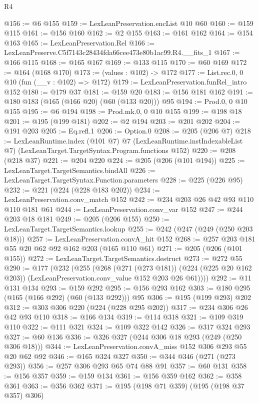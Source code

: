 \begin{lexlean}{R4}
\begin{coremodule}
@156 := @6 @155
@159 := LexLeanPreservation.encList @10 @60
@160 := @159 @115
@161 := @156 @160
@162 := @2 @155
@163 := @161 @162
@164 := @154 @163
@165 := LexLeanPreservation.Rel
@166 := LexLeanPreserve.C5f7143c28434fda66cee473e80b1ac99.R4.__fits_1
@167 := @166 @115
@168 := @165 @167
@169 := @133 @115
@170 := @60 @169
@172 := @164 (@168 @170)
@173 := (values : @102) -> @172
@177 := List.rec.{0, 0} @10 (fun (__v : @102) => @172)
@179 := LexLeanPreservation.funRel_intro @152
@180 := @179 @37
@181 := @159 @20
@183 := @156 @181 @162
@191 := @180 @183 (@165 (@166 @20) (@60 (@133 @20))) @95
@194 := Prod.{0, 0} @10 @155
@195 := @6 @194
@198 := Prod.mk.{0, 0} @10 @155
@199 := @198 @18
@201 := @195 (@199 @181)
@202 := @2 @194
@203 := @201 @202
@204 := @191 @203
@205 := Eq.refl.{1}
@206 := Option.{0}
@208 := @205 (@206 @7)
@218 := LexLeanRuntime.index
    (@101 @7)
    @7
    (LexLeanRuntime.instIndexableList @7)
    (LexLeanTarget.TargetSyntax.Program.functions @152)
@220 := @208 (@218 @37)
@221 := @204 @220
@224 := @205 (@206 (@101 @194))
@225 := LexLeanTarget.TargetSemantics.bindAll
@226 := LexLeanTarget.TargetSyntax.Function.parameters
@228 := @225 (@226 @95)
@232 := @221 (@224 (@228 @183 @202))
@234 := LexLeanPreservation.conv_match @152
@242 := @234 @203 @26 @42 @93 @110 @110 @181 @61
@244 := LexLeanPreservation.conv_var @152
@247 := @244 @203 @18 @181
@249 := @205 (@206 @155)
@250 := LexLeanTarget.TargetSemantics.lookup
@255 := @242 (@247 (@249 (@250 @203 @18)))
@257 := LexLeanPreservation.convA_hit @152
@268 := @257 @203 @181 @55 @20 @62 @92 @162 @203 (@165 @110 @61)
@271 := @205 (@206 (@101 @155))
@272 := LexLeanTarget.TargetSemantics.destruct
@273 := @272 @55
@290 := @177
    (@232
      (@255
        (@268
          (@271 (@273 @181))
          (@224 (@225 @20 @162 @203))
          (LexLeanPreservation.conv_value @152 @203 @26 @61))))
@292 := @11 @131 @134
@293 := @159 @292
@295 := @156 @293 @162
@303 := @180 @295 (@165 (@166 @292) (@60 (@133 @292))) @95
@306 := @195 (@199 @293) @202
@312 := @303 @306 @220 (@224 (@228 @295 @202))
@317 := @234 @306 @26 @42 @93 @110
@318 := @166 @134
@319 := @114 @318
@321 := @109 @319 @110
@322 := @111 @321
@324 := @109 @322 @142
@326 := @317 @324 @293
@327 := @60 @136
@336 := @326 @327 (@244 @306 @18 @293 (@249 (@250 @306 @18)))
@344 := LexLeanPreservation.convA_miss @152 @306 @293 @55 @20 @62 @92
@346 := @165 @324 @327
@350 := @344 @346 (@271 (@273 @293))
@356 := @257 @306 @293 @65 @74 @88 @91
@357 := @60 @131
@358 := @156 @357
@359 := @159 @134
@361 := @156 @359 @162
@362 := @358 @361
@363 := @356 @362
@371 := @195 (@198 @71 @359) (@195 (@198 @37 @357) @306)

\end{coremodule}
\end{lexlean}

